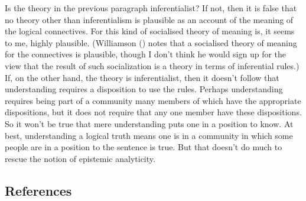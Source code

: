 \documentclass[
  10pt,
  letterpaper,
  DIV=11,
  numbers=noendperiod,
  twoside]{scrartcl}
\begin{document}
Is the theory in the previous paragraph inferentialist? If not, then it
is false that no theory other than inferentialism is plausible as an
account of the meaning of the logical connectives. For this kind of
socialised theory of meaning is, it seems to me, highly plausible.
(Williamson () notes that a
socialised theory of meaning for the connectives is plausible, though I
don't think he would sign up for the view that the result of such
socialization is a theory in terms of inferential rules.) If, on the
other hand, the theory is inferentialist, then it doesn't follow that
understanding requires a disposition to use the rules. Perhaps
understanding requires being part of a community many members of which
have the appropriate dispositions, but it does not require that any one
member have these dispositions. So it won't be true that mere
understanding puts one in a position to know. At best, understanding a
logical truth means one is in a community in which some people are in a
position to the sentence is true. But that doesn't do much to rescue the
notion of epistemic analyticity.

\subsection*{References}\label{references}
\end{document}
